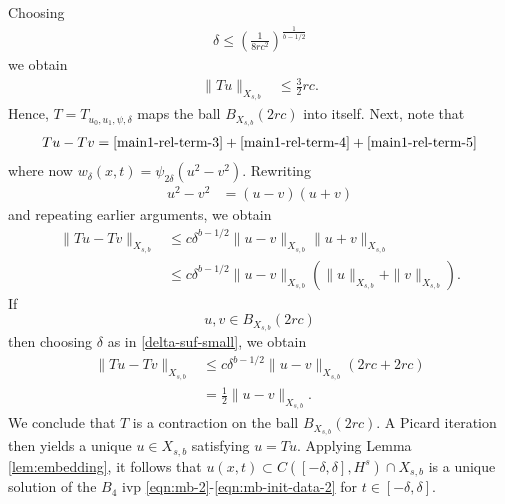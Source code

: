 \documentclass[12pt,reqno]{amsart}
\numberwithin{equation}{section}  %
\begin{document}
%
Choosing 
%
%
\begin{equation}
  \label{delta-suf-small}
\begin{split}
  \delta \le \left (\frac{1}{8rc^{2}} \right )^{\frac{1}{b - 1/2}}
\end{split}
\end{equation}
%
%
we obtain 
%
%
%
\begin{equation*}
\begin{split}
\|Tu \|_{X_{s,b}} 
    & \le \frac{3}{2}rc.
  \end{split}
\end{equation*}
%
%
Hence, $T=T_{u_0, u_1, \psi, \delta}$ maps the ball $B_{X_{s,b}}(2rc)$ into
itself. Next, note that 
%
\begin{equation*}
	\begin{split}
    Tu - Tv = \eqref{main1-rel-term-3} + \eqref{main1-rel-term-4} +
    \eqref{main1-rel-term-5} 
  \end{split}
  \label{eqn:integral-form-dif}
\end{equation*}
%
where now $w_{\delta}(x,t) =\psi_{2 \delta}(u^{2} - v^{2})$. Rewriting
%
\begin{equation*}
	\begin{split}
	u^2 - v^2
		& = (u-v)(u+v)
		\end{split}
\end{equation*}
%
and repeating earlier arguments, we obtain
%
\begin{equation}
	\label{20a}
	\begin{split}
		\|Tu - Tv \|_{X_{s,b}}  
    & \le c \delta^{b - 1/2}\|u -v\|_{X_{s,b}} \|u + v \|_{X_{s,b}}
		\\
    & \le c \delta^{b -1/2} \|u -v\|_{X_{s,b}} (\|u\|_{X_{s,b}}+ \|v \|_{X_{s,b}}).
	\end{split}
\end{equation}
%
If $$ u, v \in B_{X_{s,b}} \left (2rc \right )$$ then choosing $\delta$ as in
\eqref{delta-suf-small}, we obtain
%
\begin{equation}
	\label{21a}
	\begin{split}
		\|Tu - Tv \|_{X_{s,b}}
    & \le c \delta^{b-1/2} \|u -v \|_{X_{s,b}} \left( 2rc + 
		2rc \right)
		\\
		& = \frac{1}{2} \|u -v \|_{X_{s,b}}. 
	\end{split}
\end{equation}
%
We conclude that $T$ is a contraction on the ball $B_{X_{s,b}}(2rc)$.
A Picard iteration then yields a unique 
$u \in X_{s,b}$ satisfying $u = Tu$. Applying
Lemma \ref{lem:embedding}, it follows that $u(x,t) \subset C( [-\delta, \delta], H^s)
\cap X_{s,b}$ is a unique
solution of the $B_{4}$ ivp \eqref{eqn:mb-2}-\eqref{eqn:mb-init-data-2} for $t
\in [-\delta, \delta]$.
%
%
%
%
%
%
\end{document}

